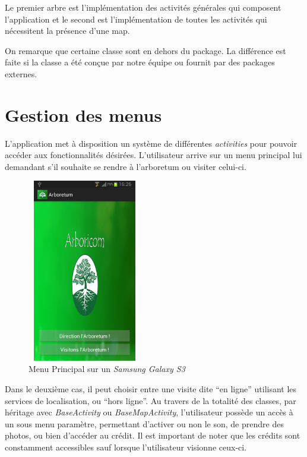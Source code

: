 \documentclass[a4paper,11pt]{article}
\begin{document}
    Le premier arbre est l'implémentation des activités générales qui composent l'application et le second est l'implémentation de toutes les activités 
    qui nécessitent la présence d'une map.
    
    On remarque que certaine classe sont en dehors du package. La différence est faite si la classe a été conçue par notre équipe ou fournit par des packages externes.
      \newpage
		\section{Gestion des menus}
		
		L'application met à disposition un système de différentes \emph{activities} pour pouvoir accéder aux fonctionnalités désirées. 
		L'utilisateur arrive sur un menu principal lui demandant s'il souhaite se rendre à l'arboretum ou visiter celui-ci. 
    \begin{figure}[H]
     \begin{center}
      \includegraphics[width=5cm,height=8cm]{menu.png}
      \caption{Menu Principal sur un \textit{Samsung Galaxy S3}}
     \end{center}
    \end{figure}
		Dans le deuxième cas, il peut choisir entre une visite dite ``en ligne'' utilisant les services de localisation, ou ``hors ligne''. 
		Au travers de la totalité des classes, par héritage avec \emph{BaseActivity} ou \emph{BaseMapActivity}, l'utilisateur possède un accès 
		à un sous menu paramètre, permettant d'activer ou non le son, de prendre des photos, ou bien d’accéder au crédit. 
		Il est important de noter que les crédits sont constamment accessibles sauf lorsque l'utilisateur visionne ceux-ci. 
\end{document}
